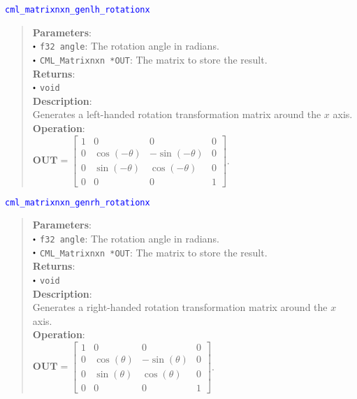 \documentclass[a4paper,oneside,8pt]{extarticle}
\newcommand{\function}[1]{
  \noindent\textcolor{blue}{\texttt{#1}}
  \vspace{-0.3em}
}
\renewcommand{\dot}{\raisebox{0.3ex}{\scalebox{0.6}{$\bullet$}}}
\theoremstyle{definition}
\begin{document}
\function{cml\_matrixnxn\_genlh\_rotationx}
\begin{quote}
  \textbf{Parameters}: \\
  $\dot$ \texttt{f32 angle}: The rotation angle in radians. \\
  $\dot$ \texttt{CML\_Matrixnxn *OUT}: The matrix to store the result. \\
  \textbf{Returns}: \\
  $\dot$ \texttt{void} \\

  \vspace{-0.75em}
  \textbf{Description}: \\
  Generates a left-handed rotation transformation matrix around the $x$ axis. \\

  \vspace{-0.75em}
  \textbf{Operation}: \\
  $\mathbf{OUT} = \begin{bmatrix}
  1 & 0 & 0 & 0 \\
  0 & \cos(-\theta) & -\sin(-\theta) & 0 \\
  0 & \sin(-\theta) & \cos(-\theta) & 0 \\
  0 & 0 & 0 & 1
  \end{bmatrix}$. \\
\end{quote}

\function{cml\_matrixnxn\_genrh\_rotationx}
\begin{quote}
  \textbf{Parameters}: \\
  $\dot$ \texttt{f32 angle}: The rotation angle in radians. \\
  $\dot$ \texttt{CML\_Matrixnxn *OUT}: The matrix to store the result. \\
  \textbf{Returns}: \\
  $\dot$ \texttt{void} \\

  \vspace{-0.75em}
  \textbf{Description}: \\
  Generates a right-handed rotation transformation matrix around the $x$ axis. \\

  \vspace{-0.75em}
  \textbf{Operation}: \\
  $\mathbf{OUT} = \begin{bmatrix}
  1 & 0 & 0 & 0 \\
  0 & \cos(\theta) & -\sin(\theta) & 0 \\
  0 & \sin(\theta) & \cos(\theta) & 0 \\
  0 & 0 & 0 & 1
  \end{bmatrix}$. \\
\end{quote}
\end{document}

